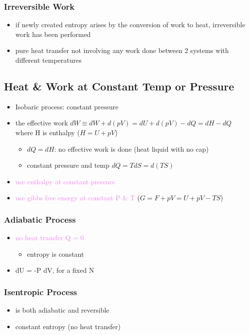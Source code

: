 \subsubsection{Irreversible Work}
\begin{itemize}
	\item if newly created entropy arises by the conversion of work to heat, irreversible
	      work has been performed
	\item pure heat transfer not involving any work done between 2 systems with different temperatures
\end{itemize}


\subsection{Heat \& Work at Constant Temp or Pressure}

\begin{itemize}
	\item Isobaric process: constant pressure
	\item the effective work $dW \equiv dW + d(pV) = dU + d(pV) -dQ = dH - dQ$
	      where H is enthalpy ($H = U + pV$)
	      \begin{itemize}
		      \item $dQ = dH$: no effective work is done (heat liquid with no cap)
		      \item constant pressure and temp $dQ = T dS = d(TS)$
	      \end{itemize}
	\item \textcolor{violet}{use enthalpy at constant pressure}
	\item \textcolor{violet}{use gibbs free energy at constant P \& T} ($G = F + pV = U +pV - TS$)
\end{itemize}

\subsubsection{Adiabatic Process}
\begin{itemize}
	\item \textcolor{violet}{no heat transfer Q = 0}
	      \begin{itemize}
		      \item entropy is constant
	      \end{itemize}
	\item dU = -P dV, for a fixed N
\end{itemize}

\subsubsection{Isentropic Process}
\begin{itemize}
	\item is both adiabatic and reversible
	\item constant entropy (no heat transfer)
\end{itemize}

